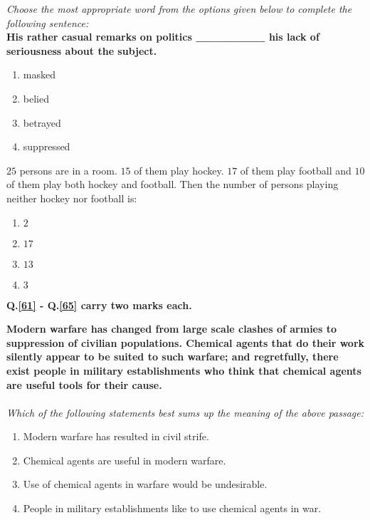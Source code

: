             \item \textit{Choose the most appropriate word from the options given below to complete the following sentence:} \\
            \textbf{His rather casual remarks on politics \_\_\_\_\_\_\_\_ his lack of seriousness about the subject.}
            \begin{enumerate}
                \item masked
                \item belied
                \item betrayed
                \item suppressed
            \end{enumerate}

            \item \label{60}$25$ persons are in a room. $15$ of them play hockey. $17$ of them play football and $10$ of them play both hockey and football. Then the number of persons playing neither hockey nor football is:
            \begin{enumerate}
                \item $2$
                \item $17$
                \item $13$
                \item $3$
            \end{enumerate}

        \item[] \textbf{Q.\ref{61} - Q.\ref{65} carry two marks each.}

    \item \label{61}\textbf{Modern warfare has changed from large scale clashes of armies to suppression of civilian populations. Chemical agents that do their work silently appear to be suited to such warfare; and regretfully, there exist people in military establishments who think that chemical agents are useful tools for their cause.} \\ \\
    \textit{Which of the following statements best sums up the meaning of the above passage:}
    \begin{enumerate}
        \item Modern warfare has resulted in civil strife.
        \item Chemical agents are useful in modern warfare.
        \item Use of chemical agents in warfare would be undesirable.
        \item People in military establishments like to use chemical agents in war.
    \end{enumerate}

